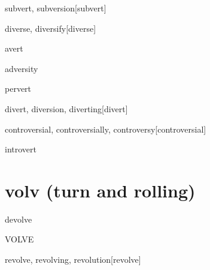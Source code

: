 \begin{RefWord}{subvert, subversion}[subvert]
\end{RefWord}

\begin{RefWord}{diverse, diversify}[diverse]
\end{RefWord}

\begin{RefWord}{avert}
\end{RefWord}

\begin{RefWord}{adversity}
\end{RefWord}

\begin{RefWord}{pervert}
\end{RefWord}

\begin{RefWord}{divert, diversion, diverting}[divert]
\end{RefWord}

\begin{RefWord}{controversial, controversially, controversy}[controversial]
\end{RefWord}

\begin{RefWord}{introvert}
\end{RefWord}

\section{volv (turn and rolling)}



\begin{RefWord}{devolve}
\end{RefWord}


\begin{RefWord}{VOLVE}
\end{RefWord}

\begin{RefWord}{revolve, revolving, revolution}[revolve]
\end{RefWord}

